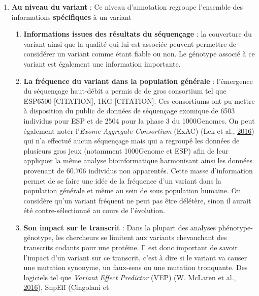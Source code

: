 \documentclass[12pt,twoside]{reedthesis}
\providecommand{\tightlist}{%
  \setlength{\itemsep}{0pt}\setlength{\parskip}{0pt}}
\theoremstyle{definition}
\theoremstyle{definition}
\theoremstyle{remark}
\begin{document}
  \begin{enumerate}
  \def\labelenumi{\arabic{enumi}.}
  \tightlist
  \item
    \textbf{Au niveau du variant} : Ce niveau d'annotation regroupe
    l'ensemble des informations \textbf{spécifiques} à un variant
  
    \begin{enumerate}
    \def\labelenumii{\alph{enumii}.}
    \tightlist
    \item
      \textbf{Informations issues des résultats du séquençage} : la
      couverture du variant ainsi que la qualité qui lui est associée
      peuvent permettre de considérer un variant comme étant fiable ou
      non. Le génotype associé à ce variant est également une information
      importante.\\
    \item
      \textbf{La fréquence du variant dans la population générale} :
      l'émergence du séquençage haut-débit a permis de de gros consortium
      tel que ESP6500 {[}CITATION{]}, 1KG {[}CITATION{]}. Ces consortiums
      ont pu mettre à disposition du public de données de séquençage
      exomique de 6503 individus pour ESP et de 2504 pour la phase 3 du
      1000Genomes. On peut également noter l'\emph{Exome Aggregate
      Consortium} (ExAC) (Lek et al.,
      \protect\hyperlink{ref-Lek2016}{2016}) qui n'a effectué aucun
      séquençage mais qui a regroupé les données de plusieurs gros jeux
      (notamment 1000Genome et ESP) afin de leur appliquer la même analyse
      bioinformatique harmonisant ainsi les données provenant de 60.706
      individus non apparentés. Cette masse d'information permet de se
      faire une idée de la fréquence d'un variant dans la population
      générale et même au sein de sous population humaine. On considère
      qu'un variant fréquent ne peut pas être délétère, sinon il aurait
      été contre-sélectionné au cours de l'évolution.\\
    \item
      \textbf{Son impact sur le transcrit} : Dans la plupart des analyses
      phénotype-génotype, les chercheurs se limitent aux variants
      chevauchant des transcrits codants pour une protéine. Il est donc
      important de savoir l'impact d'un variant sur ce transcrit, c'est à
      dire si le variant va causer une mutation synonyme, un faux-sens ou
      une mutation tronquante. Des logiciels tel que \emph{Variant Effect
      Predictor} (VEP) (W. McLaren et al.,
      \protect\hyperlink{ref-McLaren2016}{2016}), SnpEff (Cingolani et

\end{enumerate}
\end{enumerate}
\end{document}
